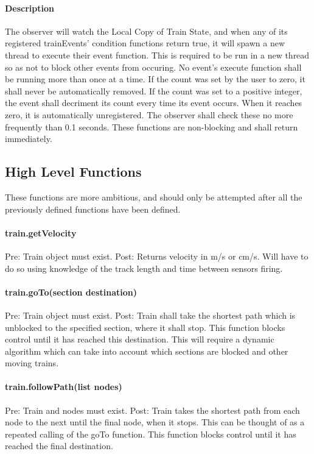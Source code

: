 \documentclass[a4paper,11pt,notitlepage]{article}
\def\LC{Local Copy of Train State\xspace}
\begin{document}
\paragraph{Description}
The observer will watch the \LC, and when any of its registered trainEvents' condition functions return true, it will spawn a new thread to execute their event function. This is required to be run in a new thread so as not to block other events from occuring. No event's execute function shall be running more than once at a time. If the count was set by the user to zero, it shall never be automatically removed. If the count was set to a positive integer, the event shall decriment its count every time its event occurs. When it reaches zero, it is automatically unregistered. The observer shall check these no more frequently than 0.1 seconds.
These functions are non-blocking and shall return immediately.

\subsection{High Level Functions}
These functions are more ambitious, and should only be attempted after all the previously defined functions have been defined.
\paragraph{train.getVelocity} Pre: Train object must exist. Post: Returns velocity in m/s or cm/s. Will have to do so using knowledge of the track length and time between sensors firing.
\paragraph{train.goTo(section destination)} Pre: Train object must exist. Post: Train shall take the shortest path which is unblocked to the specified section, where it shall stop. This function blocks control until it has reached this destination. This will require a dynamic algorithm which can take into account which sections are blocked and other moving trains.
\paragraph{train.followPath(list nodes)} Pre: Train and nodes must exist. Post: Train takes the shortest path from each node to the next until the final node, when it stops. This can be thought of as a repeated calling of the goTo function. This function blocks control until it has reached the final destination.
\end{document}
